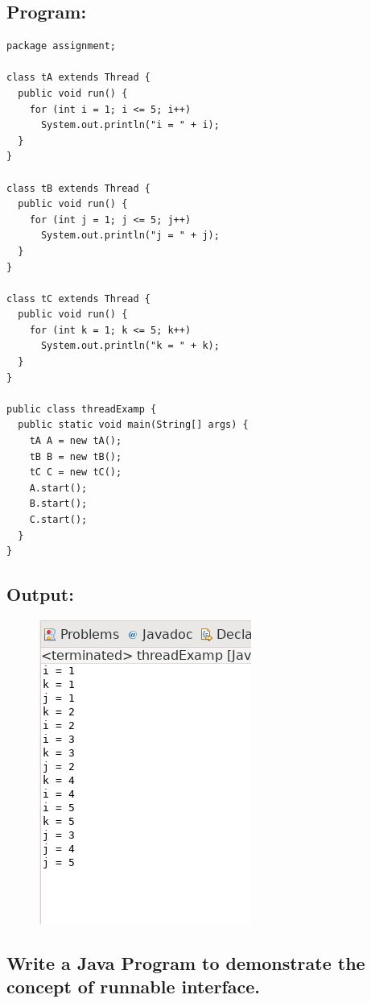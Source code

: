 \documentclass[12pt, a4paper]{article}
\begin{document}
\subsection*{Program:}
\begin{lstlisting}
package assignment;

class tA extends Thread {
  public void run() {
    for (int i = 1; i <= 5; i++)
      System.out.println("i = " + i);
  }
}

class tB extends Thread {
  public void run() {
    for (int j = 1; j <= 5; j++)
      System.out.println("j = " + j);
  }
}

class tC extends Thread {
  public void run() {
    for (int k = 1; k <= 5; k++)
      System.out.println("k = " + k);
  }
}

public class threadExamp {
  public static void main(String[] args) {
    tA A = new tA();
    tB B = new tB();
    tC C = new tC();
    A.start();
    B.start();
    C.start();
  }
}
\end{lstlisting}

\subsection*{Output:}
\begin{figure}[h]
  \includegraphics{threadExamp1}
\end{figure}
\newpage

\begin{tcolorbox}
\section{Write a Java Program to demonstrate the concept of runnable interface.}
\end{tcolorbox}
\end{document}
